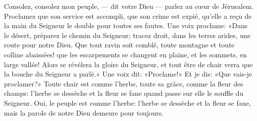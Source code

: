 Consolez, consolez mon peuple, --- dit votre Dieu ---
	parlez au cœur de Jérusalem.
Proclamez que son service est accompli, que son crime est expié,
	qu’elle a reçu de la main du Seigneur le double pour toutes ses fautes.
Une voix proclame: «Dans le désert, préparez le chemin du Seigneur;
	tracez droit, dans les terres arides, une route pour notre Dieu.
Que tout ravin soit comblé, toute montagne et toute colline abaissées!
	que les escarpements se changent en plaine, et les sommets, en large vallée!
Alors se révélera la gloire du Seigneur,
	et tout être de chair verra que la bouche du Seigneur a parlé.»
Une voix dit: «Proclame!»
	Et je dis: «Que vais-je proclamer?»
Toute chair est comme l’herbe, toute sa grâce, comme la fleur des champs:
	l’herbe se dessèche et la fleur se fane
	quand passe sur elle le souffle du Seigneur.
Oui, le peuple est comme l’herbe:
	l’herbe se dessèche et la fleur se fane,
	mais la parole de notre Dieu demeure pour toujours.
